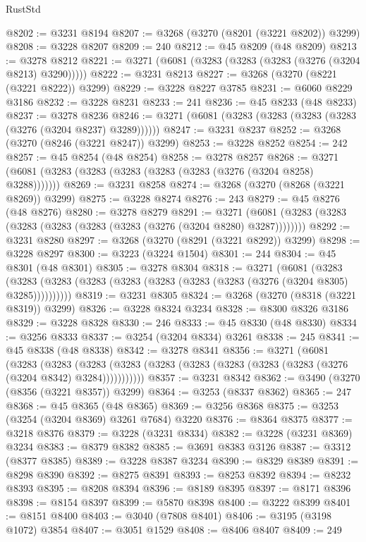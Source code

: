 \begin{lexlean}{RustStd}
\begin{coremodule}
{\begin{coremodule}
{{{{{{{{{{{{{{{{{{{{{{{{{{{{{{{{{{{{{@8202 := @3231 @8194
@8207 := @3268 (@3270 (@8201 (@3221 @8202)) @3299)
@8208 := @3228 @8207
@8209 := 240
@8212 := @45 @8209 (@48 @8209)
@8213 := @3278 @8212
@8221 := @3271 (@6081 (@3283 (@3283 (@3283 (@3276 (@3204 @8213) @3290)))))
@8222 := @3231 @8213
@8227 := @3268 (@3270 (@8221 (@3221 @8222)) @3299)
@8229 := @3228 @8227 @3785
@8231 := @6060 @8229 @3186
@8232 := @3228 @8231
@8233 := 241
@8236 := @45 @8233 (@48 @8233)
@8237 := @3278 @8236
@8246 := @3271 (@6081 (@3283 (@3283 (@3283 (@3283 (@3276 (@3204 @8237) @3289))))))
@8247 := @3231 @8237
@8252 := @3268 (@3270 (@8246 (@3221 @8247)) @3299)
@8253 := @3228 @8252
@8254 := 242
@8257 := @45 @8254 (@48 @8254)
@8258 := @3278 @8257
@8268 := @3271 (@6081 (@3283 (@3283 (@3283 (@3283 (@3283 (@3276 (@3204 @8258) @3288)))))))
@8269 := @3231 @8258
@8274 := @3268 (@3270 (@8268 (@3221 @8269)) @3299)
@8275 := @3228 @8274
@8276 := 243
@8279 := @45 @8276 (@48 @8276)
@8280 := @3278 @8279
@8291 := @3271 (@6081 (@3283 (@3283 (@3283 (@3283 (@3283 (@3283 (@3276 (@3204 @8280) @3287))))))))
@8292 := @3231 @8280
@8297 := @3268 (@3270 (@8291 (@3221 @8292)) @3299)
@8298 := @3228 @8297
@8300 := @3223 (@3224 @1504)
@8301 := 244
@8304 := @45 @8301 (@48 @8301)
@8305 := @3278 @8304
@8318 := @3271
    (@6081
      (@3283 (@3283 (@3283 (@3283 (@3283 (@3283 (@3283 (@3283 (@3276 (@3204 @8305) @3285))))))))))
@8319 := @3231 @8305
@8324 := @3268 (@3270 (@8318 (@3221 @8319)) @3299)
@8326 := @3228 @8324 @3234
@8328 := @8300 @8326 @3186
@8329 := @3228 @8328
@8330 := 246
@8333 := @45 @8330 (@48 @8330)
@8334 := @3256 @8333
@8337 := @3254 (@3204 @8334) @3261
@8338 := 245
@8341 := @45 @8338 (@48 @8338)
@8342 := @3278 @8341
@8356 := @3271
    (@6081
      (@3283
        (@3283
          (@3283 (@3283 (@3283 (@3283 (@3283 (@3283 (@3283 (@3276 (@3204 @8342) @3284)))))))))))
@8357 := @3231 @8342
@8362 := @3490 (@3270 (@8356 (@3221 @8357)) @3299)
@8364 := @3253 (@8337 @8362)
@8365 := 247
@8368 := @45 @8365 (@48 @8365)
@8369 := @3256 @8368
@8375 := @3253 (@3254 (@3204 @8369) @3261 @7684) @3220
@8376 := @8364 @8375
@8377 := @3218 @8376
@8379 := @3228 (@3231 @8334)
@8382 := @3228 (@3231 @8369) @3234
@8383 := @8379 @8382
@8385 := @3691 @8383 @3126
@8387 := @3312 (@8377 @8385)
@8389 := @3228 @8387 @3234
@8390 := @8329 @8389
@8391 := @8298 @8390
@8392 := @8275 @8391
@8393 := @8253 @8392
@8394 := @8232 @8393
@8395 := @8208 @8394
@8396 := @8189 @8395
@8397 := @8171 @8396
@8398 := @8154 @8397
@8399 := @5870 @8398
@8400 := @3222 @8399
@8401 := @8151 @8400
@8403 := @3040 (@7808 @8401)
@8406 := @3195 (@3198 @1072) @3854
@8407 := @3051 @1529
@8408 := @8406 @8407
@8409 := 249
}}}}}}}}}}}}}}}}}}}}}}}}}}}}}}}}}}}}}
\end{coremodule}}
\end{coremodule}
\end{lexlean}
